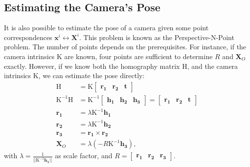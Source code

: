 \subsection{Estimating the Camera's Pose}
It is also possible to estimate the pose of a camera given some point 
correspondences $\mathbf{x}^i \leftrightarrow \mathbf{X}^i$. This problem 
is known as the Perspective-N-Point problem. The number of points 
depends on the prerequisites. For instance, if the camera 
intrinsics $\mathrm{K}$ are known, four points are sufficient
\cite{grunert1841} to determine $R$ and $\boldsymbol{X}_O$ exactly. 
However, if we know both the homography matrix $\mathrm{H}$, and the 
camera intrinsics $\mathrm{K}$, we can estimate the pose 
directly:
\begin{equation}
\begin{aligned}
	\mathrm{H} & = \mathrm{K} \begin{bmatrix} \mathbf{r_1} & \mathbf{r_2} & \mathbf{t}\end{bmatrix} \\ 
	\mathrm{K}^{-1}\mathrm{H} & 
	= \mathrm{K}^{-1} \begin{bmatrix} \mathbf{h_1} & \mathbf{h_2} & \mathbf{h_3} \end{bmatrix}
	= \begin{bmatrix} \mathbf{r_1} & \mathbf{r_2} & \mathbf{t}\end{bmatrix} \\
	\mathbf{r_1} & = \lambda \mathrm{K}^{-1} \mathbf{h_1} \\
	\mathbf{r_2} & = \lambda \mathrm{K}^{-1} \mathbf{h_2} \\
	\mathbf{r_3} & = \mathbf{r_1} \times \mathbf{r_2} \\
	\boldsymbol{X}_O & = \lambda \left( {-R} \mathrm{K}^{-1} \mathbf{h_3} \right),
\end{aligned}
\label{eq:pose_background}
\end{equation}
with $\lambda = \frac{1}{||\mathrm{K}^{-1} \mathbf{h_1}||}$ as scale factor,
and $R=\begin{bmatrix} \mathbf{r_1} & \mathbf{r_2} & \mathbf{r_3} \end{bmatrix}$.
